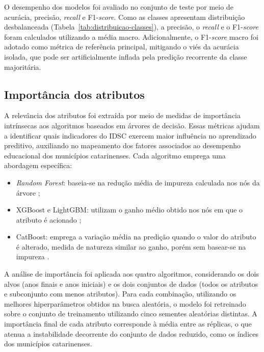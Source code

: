 O desempenho dos modelos foi avaliado no conjunto de teste por meio de acurácia, precisão, \textit{recall} e F1-\textit{score}. Como as classes apresentam distribuição desbalanceada (Tabela~\ref{tab:distribuicao-classes}), a precisão, o \textit{recall} e o F1-\textit{score} foram calculados utilizando a média macro. Adicionalmente, o F1-\textit{score} macro foi adotado como métrica de referência principal, mitigando o viés da acurácia isolada, que pode ser artificialmente inflada pela predição recorrente da classe majoritária.

\subsection{Importância dos atributos}

A relevância dos atributos foi extraída por meio de medidas de importância intrínsecas aos algoritmos baseados em árvores de decisão. Essas métricas ajudam a identificar quais indicadores do IDSC exercem maior influência no aprendizado preditivo, auxiliando no mapeamento dos fatores associados ao desempenho educacional dos municípios catarinenses. Cada algoritmo emprega uma abordagem específica:

\begin{itemize}
	\item \textit{Random Forest}: baseia-se na redução média de impureza calculada nos nós da árvore \cite{breiman2001};
	\item XGBoost e LightGBM: utilizam o ganho médio obtido nos nós em que o atributo é acionado \cite{chen2016xgboost, ke2017lightgbm};
	\item CatBoost: emprega a variação média na predição quando o valor do atributo é alterado, medida de natureza similar ao ganho, porém sem basear-se na impureza \cite{prokhorenkova2018catboost}.
\end{itemize}

A análise de importância foi aplicada aos quatro algoritmos, considerando os dois alvos (anos finais e anos iniciais) e os dois conjuntos de dados (todos os atributos e subconjunto com menos atributos). Para cada combinação, utilizando os melhores hiperparâmetros obtidos na busca aleatória, o modelo foi retreinado sobre o conjunto de treinamento utilizando cinco sementes aleatórias distintas. A importância final de cada atributo corresponde à média entre as réplicas, o que atenua a instabilidade decorrente do conjunto de dados reduzido, como os índices dos municípios catarinenses. 

